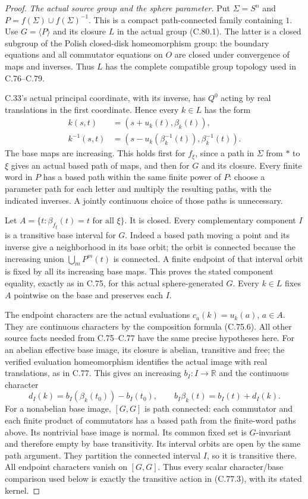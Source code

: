 \begin{proof}
\emph{The actual source group and the sphere parameter.}
Put $\Sigma=S^n$ and
$P=f(\Sigma)\cup f(\Sigma)^{-1}$. This is a compact
path-connected family containing $1$. Use
$G=\langle P\rangle$ and its closure $L$ in the
actual group (C.80.1). The latter is a closed
subgroup of the Polish closed-disk homeomorphism
group: the boundary equations and all commutator
equations on $O$ are closed under convergence of
maps and inverses. Thus $L$ has the complete
compatible group topology used in C.76--C.79.

C.33's actual principal coordinate, with its
inverse, has $Q^0$ acting by real translations
in the first coordinate. Hence every $k\in L$
has the form
\[
 \begin{split}
 k(s,t)&=(s+u_k(t),\beta_k(t)),\\
 k^{-1}(s,t)&=
    (s-u_k(\beta_k^{-1}(t)),\beta_k^{-1}(t)).
 \end{split}                                                   \tag{C.80.3}
\]
The base maps are increasing. This holds first
for $f_\xi$, since a path in $\Sigma$ from $*$
to $\xi$ gives an actual based path of maps,
and then for $G$ and its closure. Every finite
word in $P$ has a based path within the same
finite power of $P$: choose a parameter path
for each letter and multiply the resulting
paths, with the indicated inverses. A jointly
continuous choice of those paths is unnecessary.

Let $A=\{t:\beta_{f_\xi}(t)=t\text{ for all }\xi\}$.
It is closed. Every complementary component
$I$ is a transitive base interval for $G$.
Indeed a based path moving a point and its
inverse give a neighborhood in its base orbit;
the orbit is connected because the increasing
union $\bigcup_m P^m(t)$ is connected. A finite
endpoint of that interval orbit is fixed by
all its increasing base maps. This proves
the stated component equality, exactly as
in C.75, for this actual sphere-generated $G$.
Every $k\in L$ fixes $A$ pointwise on the base
and preserves each $I$.

The endpoint characters are the actual evaluations
$c_a(k)=u_k(a)$, $a\in A$. They are continuous
characters by the composition formula (C.75.6).
All other source facts needed from C.75--C.77
have the same precise hypotheses here. For an
abelian effective base image, its closure is
abelian, transitive and free; the verified
evaluation homeomorphism identifies the actual
image with real translations, as in C.77.
This gives an increasing $b_I:I\to\mathbb R$
and the continuous character
\[
 d_I(k)=b_I(\beta_k(t_0))-b_I(t_0),\qquad
 b_I\beta_k(t)=b_I(t)+d_I(k).
                                                               \tag{C.80.4}
\]
For a nonabelian base image, $[G,G]$ is path
connected: each commutator and each finite
product of commutators has a based path from
the finite-word paths above. Its nontrivial
base image is normal. Its common fixed set
is $G$-invariant and therefore empty by base
transitivity. Its interval orbits are open
by the same path argument. They partition
the connected interval $I$, so it is transitive
there. All endpoint characters vanish on
$[G,G]$. Thus every scalar character/base
comparison used below is exactly the transitive
action in (C.77.3), with its stated kernel.


\end{proof}

